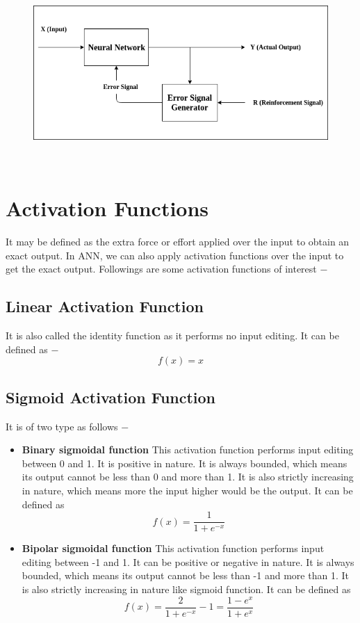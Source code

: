 \documentclass{report}
\begin{document}
\begin{figure}[htbp]
\centering
\includegraphics[height=7cm]{Pictures/Reinforcement Learning.png}
\caption{}
\label{}
\end{figure}


\section{Activation Functions}
It may be defined as the extra force or effort applied over the input to obtain an exact output. In ANN, we can also apply activation functions over the input to get the exact output. Followings are some activation functions of interest −

\subsection{Linear Activation Function}
It is also called the identity function as it performs no input editing. It can be defined as −
\[f(x) = x\]

\subsection{Sigmoid Activation Function}
It is of two type as follows −

\begin{itemize}
\item \textbf{Binary sigmoidal function} This activation function performs input editing between 0 and 1. It is positive in nature. It is always bounded, which means its output cannot be less than 0 and more than 1. It is also strictly increasing in nature, which means more the input higher would be the output. It can be defined as
\[f(x) = \frac{1}{1+e^{-x}}\]

\item \textbf{Bipolar sigmoidal function} This activation function performs input editing between -1 and 1. It can be positive or negative in nature. It is always bounded, which means its output cannot be less than -1 and more than 1. It is also strictly increasing in nature like sigmoid function. It can be defined as\[f(x) = \frac{2}{1+e^{-x}}-1 = \frac{1-e^{x}}{1+e^{x}}\]


\end{itemize}
\end{document}
